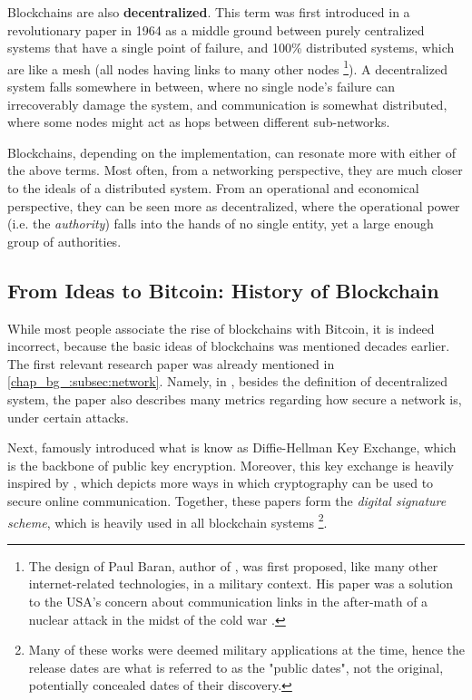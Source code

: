 Blockchains are also \textbf{decentralized}. This term was first introduced in a revolutionary paper
in 1964 as a middle ground between purely centralized systems that have a single point of failure,
and 100\% distributed systems, which are like a mesh (all nodes having links to many other nodes
\cite{baranDistributedCommunicationsNetworks1964} \footnote{The design of Paul Baran, author of
\cite{baranDistributedCommunicationsNetworks1964}, was first proposed, like many other
internet-related technologies, in a military context. His paper was a solution to the USA's concern
about communication links in the after-math of a nuclear attack in the midst of the cold war
\cite{monicaPaulBaranOrigins}.}). A decentralized system falls somewhere in between, where no single
node's failure can irrecoverably damage the system, and communication is somewhat
distributed, where some nodes might act as hops between different sub-networks.

Blockchains, depending on the implementation, can resonate more with either of the above terms. Most
often, from a networking perspective, they are much closer to the ideals of a distributed system.
From an operational and economical perspective, they can be seen more as decentralized, where the
operational power (i.e. the \textit{authority}) falls into the hands of no single entity, yet a
large enough group of authorities.


\subsection{From Ideas to Bitcoin: History of Blockchain} \label{chap_bg_:subsec:hisotry}

While most people associate the rise of blockchains with Bitcoin, it is indeed incorrect, because the
basic ideas of blockchains was mentioned decades earlier. The first relevant research paper was
already mentioned in \ref{chap_bg_:subsec:network}. Namely, in
\cite{baranDistributedCommunicationsNetworks1964}, besides the definition of decentralized system,
the paper also describes many metrics regarding how secure a network is, under certain
attacks.

Next, \cite{diffieNewDirectionsCryptography1976} famously introduced what is know as Diffie-Hellman
Key Exchange, which is the backbone of public key encryption. Moreover, this key exchange is heavily
inspired by \cite{merkleSecureCommunicationsInsecure1978}, which depicts more ways in which
cryptography can be used to secure online communication. Together, these papers form the
\textit{digital signature scheme}, which is heavily used in all blockchain systems \footnote{Many of
these works were deemed military applications at the time, hence the release dates are what is
referred to as the "public dates", not the original, potentially concealed dates of their
discovery.}.

